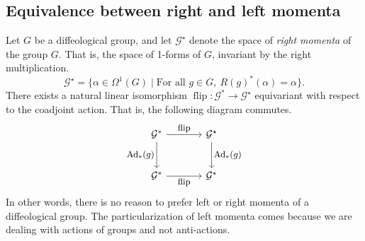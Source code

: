 \documentclass[10pt,reqno,twoside]{amsart}
\newcommand{\cG}{\mathcal{G}}
\DeclareMathOperator{\Ad}{Ad}
\DeclareMathOperator{\flip}{flip}
\newcommand{\R}{R}
\theoremstyle{plain}
\theoremstyle{definition}
\newcommand{\article}[1]{\subsection{#1}}
\begin{document}
  \article{Equivalence between right and left momenta}
  \label{Equivalence-between-right-and-left-momenta}
  Let $G$ be a diffeological group,
  and let $\cG^\star$ denote the space of {\em right momenta} of the group $G$.
  That is,
  the space of 1-forms of $G$,
  invariant by the right multiplication.
  $$ \cG^\star = \{ \alpha \in \Omega^1(G) \mid \mbox{For all } g \in G, \ \R(g)^*(\alpha) = \alpha \}.
    $$
  There exists a natural linear isomorphism $\flip : \cG^* \to \cG^\star$ equivariant with respect to the coadjoint action.
  That is,
  the following diagram commutes.
  \[
  \begin{tikzcd}[column sep=large, row sep=large, every label/.append style = {font = \small}]
    \cG^* \arrow[r, "\flip"] \arrow[d, "\Ad_*(g)"'] & \cG^\star \arrow[d, "\Ad_*(g)"] \\
    \cG^* \arrow[r, "\flip"'] & \cG^\star
  \end{tikzcd}
  \]
  In other words,
  there is no reason to prefer left or right momenta of a diffeological group.
  The particularization of left momenta comes because we are dealing with actions of groups and not anti-actions.
  
\end{document}
